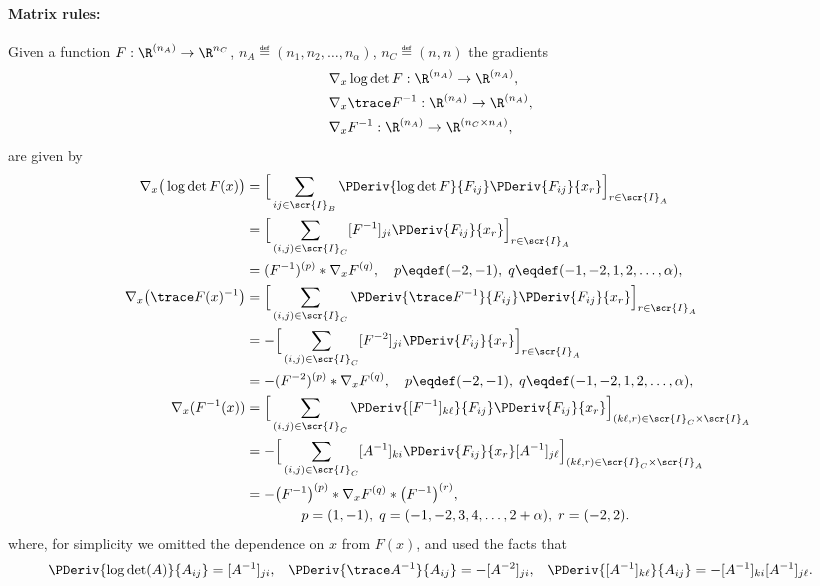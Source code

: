 \documentclass[11pt]{article}
\theoremstyle{remark}
\begin{document}
\paragraph{Matrix rules:} Given a function
$F:\R^{(n_A)}\to\R^{{n_C}}$, $n_A\eqdef(n_1,n_2,\dots,n_\alpha)$, $n_C\eqdef(n,n)$ the gradients
\begin{align*}
  &\nabla_x \log\det F:\R^{(n_A)}\to\R^{(n_A)}, \\
  &\nabla_x \trace F^{-1}:\R^{(n_A)}\to\R^{(n_A)}, \\
  &\nabla_x F^{-1}:\R^{(n_A)}\to\R^{(n_C\times n_A)}, &
\end{align*}
are given by
\begin{align*}
  \nabla_x \big(\log\det F (x)\big)
  &= \Big[\sum_{ij\in\scr{I}_B}\PDeriv{\log\det F}{F_{ij}}\PDeriv{F_{ij}}{x_r}\Big]_{r\in\scr{I}_A}\\
  &= \Big[\sum_{(i,j)\in\scr{I}_C}[F^{-1}]_{ji}
  \PDeriv{F_{ij}}{x_r}\Big]_{r\in\scr{I}_A}\\
  &= (F^{-1})^{(p)} * \nabla_x F^{(q)}, \quad
  p\eqdef(-2,-1), \;
  q\eqdef(-1,-2,1,2,\dots,\alpha),\\
  \nabla_x \big(\trace F(x)^{-1}\big)
  &= \Big[\sum_{(i,j)\in\scr{I}_C}\PDeriv{\trace F^{-1}}{F_{ij}}
  \PDeriv{F_{ij}}{x_r}\Big]_{r\in\scr{I}_A}\\
  &=-\Big[\sum_{(i,j)\in\scr{I}_C}[F^{-2}]_{ji}
  \PDeriv{F_{ij}}{x_r}\Big]_{r\in\scr{I}_A}\\
  &= -(F^{-2})^{(p)} * \nabla_x F^{(q)}, \quad
  p\eqdef(-2,-1), \;
  q\eqdef(-1,-2,1,2,\dots,\alpha),\\
  \nabla_x (F^{-1}(x))
  &= \Big[\sum_{(i,j)\in\scr{I}_C}\PDeriv{[F^{-1}]_{k\ell}}{F_{ij}}
  \PDeriv{F_{ij}}{x_r}\Big]_{(k\ell,r)\in\scr{I}_C\times\scr{I}_A}\\
  &= -\Big[\sum_{(i,j)\in\scr{I}_C}[A^{-1}]_{ki}
  \PDeriv{F_{ij}}{x_r}[A^{-1}]_{j\ell}\Big]_{(k\ell,r)\in\scr{I}_C\times\scr{I}_A}\\
  &= - \big(F^{-1}\big)^{(p)} * \nabla_x F^{(q)} * \big(F^{-1}\big)^{(r)},
  \\&\qquad\qquad
  p=(1,-1), \;
  q=(-1,-2,3,4,\dots,2+\alpha),\;
  r=(-2,2).
\end{align*}
where, for simplicity we omitted the
dependence on $x$ from $F(x)$, and used the facts that
\begin{align*}
  &\PDeriv{\log\det(A)}{A_{ij}}=[A^{-1}]_{ji}, &
  &\PDeriv{\trace A^{-1}}{A_{ij}}=-[A^{-2}]_{ji}, &
  &\PDeriv{[A^{-1}]_{k\ell}}{A_{ij}}=-[A^{-1}]_{ki}[A^{-1}]_{j\ell}.
\end{align*}
\end{document}
